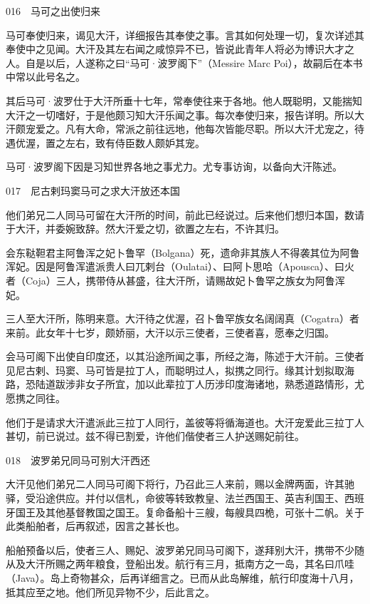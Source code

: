 \documentclass[12pt,UTF8]{ctexbook}
\begin{document}
016　马可之出使归来

马可奉使归来，谒见大汗，详细报告其奉使之事。言其如何处理一切，复次详述其奉使中之见闻。大汗及其左右闻之咸惊异不已，皆说此青年人将必为博识大才之人。自是以后，人遂称之曰“马可·波罗阁下”（Messire Marc Poi），故嗣后在本书中常以此号名之。

其后马可·波罗仕于大汗所垂十七年，常奉使往来于各地。他人既聪明，又能揣知大汗之一切嗜好，于是他颇习知大汗乐闻之事。每次奉使归来，报告详明。所以大汗颇宠爱之。凡有大命，常派之前往远地，他每次皆能尽职。所以大汗尤宠之，待遇优渥，置之左右，致有侍臣数人颇妒其宠。

马可·波罗阁下因是习知世界各地之事尤力。尤专事访询，以备向大汗陈述。





017　尼古剌玛窦马可之求大汗放还本国

他们弟兄二人同马可留在大汗所的时间，前此已经说过。后来他们想归本国，数请于大汗，并委婉致辞。然大汗爱之切，欲置之左右，不许其归。

会东鞑靼君主阿鲁浑之妃卜鲁罕（Bolgana）死，遗命非其族人不得袭其位为阿鲁浑妃。因是阿鲁浑遣派贵人曰兀剌台（Oulatai）、曰阿卜思哈（Apousca）、曰火者（Coja）三人，携带侍从甚盛，往大汗所，请赐故妃卜鲁罕之族女为阿鲁浑妃。

三人至大汗所，陈明来意。大汗待之优渥，召卜鲁罕族女名阔阔真（Cogatra）者来前。此女年十七岁，颇娇丽，大汗以示三使者，三使者喜，愿奉之归国。

会马可阁下出使自印度还，以其沿途所闻之事，所经之海，陈述于大汗前。三使者见尼古剌、玛窦、马可皆是拉丁人，而聪明过人，拟携之同行。缘其计划拟取海路，恐陆道跋涉非女子所宜，加以此辈拉丁人历涉印度海诸地，熟悉道路情形，尤愿携之同往。

他们于是请求大汗遣派此三拉丁人同行，盖彼等将循海道也。大汗宠爱此三拉丁人甚切，前已说过。兹不得已割爱，许他们偕使者三人护送赐妃前往。





018　波罗弟兄同马可别大汗西还

大汗见他们弟兄二人同马可阁下将行，乃召此三人来前，赐以金牌两面，许其驰驿，受沿途供应。并付以信札，命彼等转致教皇、法兰西国王、英吉利国王、西班牙国王及其他基督教国之国王。复命备船十三艘，每艘具四桅，可张十二帆。关于此类船舶者，后再叙述，因言之甚长也。

船舶预备以后，使者三人、赐妃、波罗弟兄同马可阁下，遂拜别大汗，携带不少随从及大汗所赐之两年粮食，登船出发。航行有三月，抵南方之一岛，其名曰爪哇（Java）。岛上奇物甚众，后再详细言之。已而从此岛解维，航行印度海十八月，抵其应至之地。他们所见异物不少，后此言之。
\end{document}

